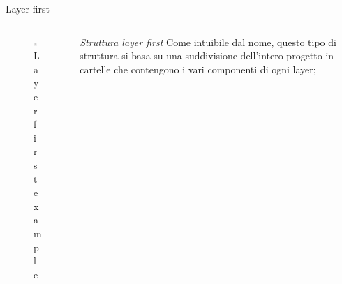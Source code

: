 \documentclass{../libs/presentation_format}
\begin{document}
\begin{frame}{Layer first}
	\begin{minipage}[0.2\textheight]{\textwidth}
		\begin{columns}[T]
			\begin{column}{0.4\textwidth}
				\begin{figure}[htpb]
					\centering
					\includegraphics[width=4cm]{../libs/layer-first-tree}
					\caption{Layer first example \cite{scalableFolder}}
					\label{fig: Layer first example}
				\end{figure}
			\end{column}
			\begin{column}{0.6\textwidth}
				\emph{Struttura layer first}
				\newline
				Come intuibile dal nome, questo tipo di struttura si basa su una suddivisione dell'intero progetto in cartelle che contengono i vari componenti di ogni layer;
			\end{column}
		\end{columns}
	\end{minipage}
\end{frame}

\end{document}
